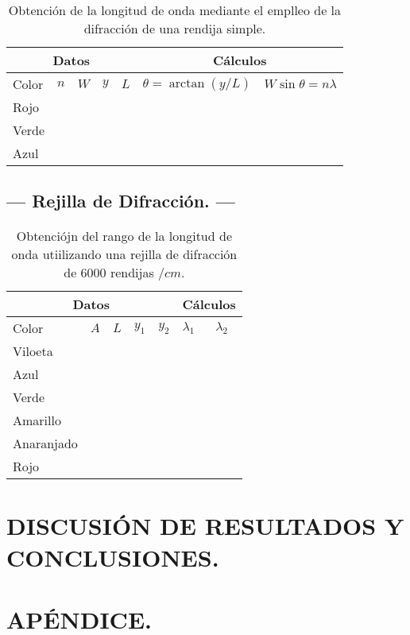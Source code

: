 \documentclass[12pt,a4paper]{article}
\begin{document}
\begin{table}[hbtp!]
	\centering
	\caption{Obtención de la longitud de onda mediante el emplleo de la difracción de una rendija simple.}
	\begin{tabular}{*{7}{l}}
		\multicolumn{5}{c|}{Datos} & \multicolumn{2}{c}{Cálculos} \\ \hline
		Color & \(n\) & \(W\) & \(y\) & \(L\) & \(\theta = \arctan (y/L) \) & \(W \sin \theta = n \lambda\) \\ \hline
		Rojo &&&&&& \\ \hline
		Verde &&&&&& \\ \hline
		Azul &&&&&& \\ \hline
	\end{tabular}
	\label{tab:longitud_onda}
\end{table}


\subsection{--- Rejilla de Difracción. ---} %
\label{sub:resul_reijlla_de_difraccion}
\begin{table}[hbtp!]
	\centering
	\caption{Obtenciójn del rango de la longitud de onda utiilizando una rejilla de difracción de \(6000\) rendijas \(/cm\).} 
	\begin{tabular}{*{7}{l}}
		\hline 
		\multicolumn{5}{c|}{Datos} & \multicolumn{2}{c}{Cálculos} \\ \hline
		Color & \(A\) & \(L\) & \(y_1\) & \(y_2\) & \(\lambda _1\) & \(\lambda _2\) \\ \hline
		Viloeta &&&&&& \\ \hline
		Azul &&&&&& \\ \hline
		Verde &&&&&& \\ \hline
		Amarillo &&&&&& \\ \hline
		Anaranjado &&&&&& \\ \hline
		Rojo &&&&&& \\ \hline
	\end{tabular}
	\label{tab:longtud_por_difraccion}
\end{table}


\section{DISCUSIÓN DE RESULTADOS Y CONCLUSIONES.} %

% 
% 

\section{APÉNDICE.} %
\end{document}
